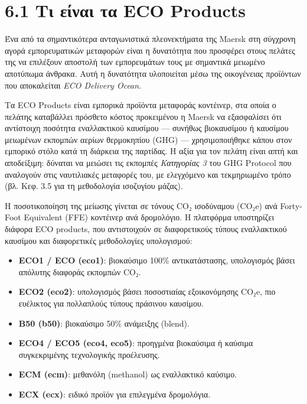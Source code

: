 \section{6.1 Τι είναι τα ECO
Products}\label{ux3c4ux3b9-ux3b5ux3afux3bdux3b1ux3b9-ux3c4ux3b1-eco-products}

Ένα από τα σημαντικότερα ανταγωνιστικά πλεονεκτήματα της Maersk στη
σύγχρονη αγορά εμπορευματικών μεταφορών είναι η δυνατότητα που προσφέρει
στους πελάτες της να επιλέξουν αποστολή των εμπορευμάτων τους με
σημαντικά μειωμένο αποτύπωμα άνθρακα. Αυτή η δυνατότητα υλοποιείται μέσω
της οικογένειας προϊόντων που αποκαλείται \emph{ECO Delivery Ocean}.

Τα ECO Products είναι εμπορικά προϊόντα μεταφοράς κοντέινερ, στα οποία ο
πελάτης καταβάλλει πρόσθετο κόστος προκειμένου η Maersk να εξασφαλίσει
ότι αντίστοιχη ποσότητα εναλλακτικού καυσίμου --- συνήθως βιοκαυσίμου ή
καυσίμου μειωμένων εκπομπών αερίων θερμοκηπίου (GHG) --- χρησιμοποιήθηκε
κάπου στον εμπορικό στόλο κατά τη διάρκεια της παρτίδας. Η αξία για τον
πελάτη είναι απτή και αποδείξιμη: δύναται να μειώσει τις εκπομπές
\emph{Κατηγορίας 3} του GHG Protocol που αναλογούν στις ναυτιλιακές
μεταφορές του, με ελεγχόμενο και τεκμηριωμένο τρόπο (βλ. Κεφ. 3.5 για τη
μεθοδολογία ισοζυγίου μάζας).

Η ποσοτικοποίηση της μείωσης γίνεται σε τόνους CO₂ ισοδύναμου (CO₂e) ανά
Forty-Foot Equivalent (FFE) κοντέινερ ανά δρομολόγιο. Η πλατφόρμα
υποστηρίζει διάφορα ECO products, που αντιστοιχούν σε διαφορετικούς
τύπους εναλλακτικού καυσίμου και διαφορετικές μεθοδολογίες υπολογισμού:

\begin{itemize}
\tightlist
\item
  \textbf{ECO1 / ECO (eco1)}: βιοκαύσιμο 100\% αντικατάστασης,
  υπολογισμός βάσει απόλυτης διαφοράς εκπομπών CO₂.
\item
  \textbf{ECO2 (eco2)}: υπολογισμός βάσει ποσοστιαίας εξοικονόμησης
  CO₂e, πιο ευέλικτος για πολλαπλούς τύπους πράσινου καυσίμου.
\item
  \textbf{B50 (b50)}: βιοκαύσιμο 50\% ανάμειξης (blend).
\item
  \textbf{ECO4 / ECO5 (eco4, eco5)}: προηγμένα βιοκαύσιμα ή καύσιμα
  συγκεκριμένης τεχνολογικής προέλευσης.
\item
  \textbf{ECM (ecm)}: μεθανόλη (methanol) ως εναλλακτικό καύσιμο.
\item
  \textbf{ECX (ecx)}: ειδικό προϊόν για επιλεγμένα δρομολόγια.
\end{itemize}

